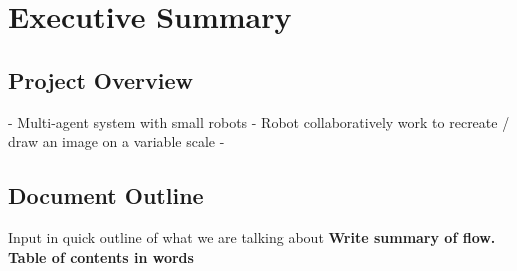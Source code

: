 
\section {Executive Summary}
\label{sec:executive_summary}

\subsection{Project Overview}
- Multi-agent system with small robots
- Robot collaboratively work to recreate / draw an image on a variable scale
- 

\subsection{Document Outline}
Input in quick outline of what we are talking about
\textbf{Write summary of flow. Table of contents in words}